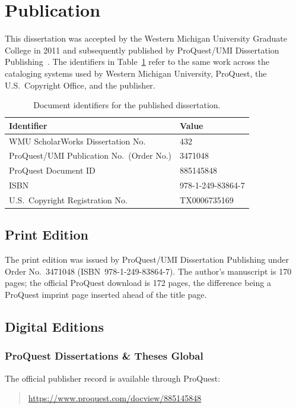\section{Publication}
This dissertation was accepted by the Western Michigan University Graduate College in 2011 and subsequently published by ProQuest/UMI Dissertation Publishing~\cite{Lighthall_2011}. The identifiers in Table~\ref{tab:doc_id} refer to the same work across the cataloging systems used by Western Michigan University, ProQuest, the U.S.\ Copyright Office, and the publisher.

\begin{table}[h]
\centering
\renewcommand{\arraystretch}{1.2}
\begin{tabular}{ll}
\hline
Identifier & Value \\
\hline\hline
WMU ScholarWorks Dissertation No.        & 432 \\
ProQuest/UMI Publication No.\ (Order No.) & 3471048 \\
ProQuest Document ID                      & 885145848 \\
ISBN                                      & 978-1-249-83864-7 \\
U.S.\ Copyright Registration No.          & TX0006735169 \\
\hline
\end{tabular}
\caption[Document identifiers.]{Document identifiers for the published dissertation.}
\label{tab:doc_id}
\end{table}
\FloatBarrier

\subsection{Print Edition}
The print edition was issued by ProQuest/UMI Dissertation Publishing under Order No.~3471048 (ISBN~978-1-249-83864-7). The author's manuscript is 170 pages; the official ProQuest download is 172 pages, the difference being a ProQuest imprint page inserted ahead of the title page.

\subsection{Digital Editions}
\subsubsection*{ProQuest Dissertations \& Theses Global}
The official publisher record is available through ProQuest:
\begin{quote}
\url{https://www.proquest.com/docview/885145848}
\end{quote}

